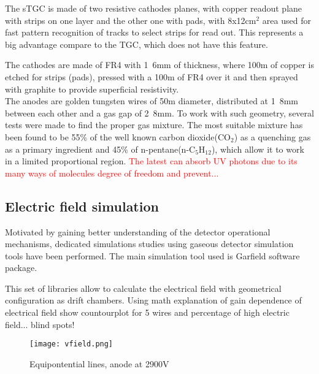 The sTGC is made of two resistive cathodes planes, with copper readout plane with strips on one layer and the other one
with pads, with \unit{8x12}{cm$^2$} area used for fast pattern recognition of tracks to select strips for read out. This
represents a big
advantage compare to the TGC, which does not have this feature.\par
The cathodes are made of FR4 with \unit{1.6}{mm} of thickness, where \si{100}{\micro m} of copper is etched for strips
(pads), pressed with a \unit{100}{\micro m} of FR4 over it and then sprayed with graphite to provide superficial resistivity.\\
The anodes are golden tungsten wires of \unit{50}{\micro m} diameter,
distributed at \unit{1.8}{mm} between each other and a gas gap of \unit{2.8}{mm}. To work with such geometry, several
tests were made to find the proper gas
mixture\cite{gaschoice}. The most suitable mixture has been found to be 55\% of the well known carbon dioxide(CO$_2$)
as a quenching gas as a primary ingredient and 45\% of n-pentane(n-C$_5$H$_{12}$), which allow it to work in a limited proportional region. 
\textcolor{red}{The latest can absorb UV photons due to its many ways of molecules degree of freedom and prevent...}\par 




\subsection{Electric field simulation}

Motivated by gaining better understanding of the detector operational mechanisms, dedicated simulations studies using
gaseous detector simulation tools have been performed. The main simulation tool used is Garfield
\cite{garfield1,garfield2} software package.\par
This set of libraries allow to calculate the electrical field with geometrical configuration as drift chambers. Using 
math explanation of gain dependence of electrical field
show countourplot for 5 wires and percentage of high electric field...
blind spots!
\begin{figure}[ht]
	\centering
	\texttt{[image: vfield.png]}
	\caption{Equipontential lines, anode at 2900V}\label{fig:vfield}
\end{figure}

